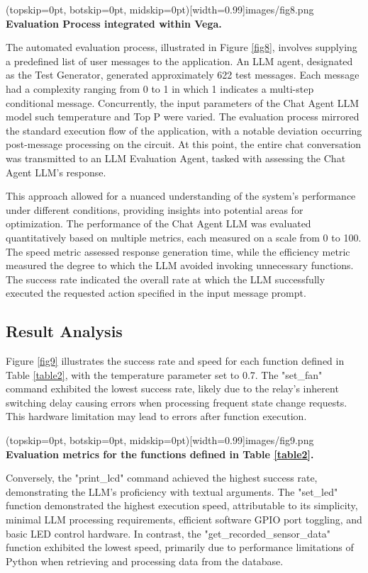 \documentclass{ieeeaccess}
\begin{document}
\Figure[t!](topskip=0pt, botskip=0pt, midskip=0pt)[width=0.99\columnwidth]{{images/fig8.png}}
{ \textbf{Evaluation Process integrated within Vega.}\label{fig8}}

The automated evaluation process, illustrated in Figure \ref{fig8}, involves supplying a predefined list of user messages to the application. An LLM agent, designated as the Test Generator, generated approximately 622 test messages. Each message had a complexity ranging from 0 to 1 in which 1 indicates a multi-step conditional message. Concurrently, the input parameters of the Chat Agent LLM model such temperature and Top P \cite{rum2024setting} were varied. The evaluation process mirrored the standard execution flow of the application, with a notable deviation occurring post-message processing on the circuit. At this point, the entire chat conversation was transmitted to an LLM Evaluation Agent, tasked with assessing the Chat Agent LLM's response. 

This approach allowed for a nuanced understanding of the system's performance under different conditions, providing insights into potential areas for optimization. The performance of the Chat Agent LLM was evaluated quantitatively based on multiple metrics, each measured on a scale from 0 to 100. The speed metric assessed response generation time, while the efficiency metric measured the degree to which the LLM avoided invoking unnecessary functions. The success rate indicated the overall rate at which the LLM successfully executed the requested action specified in the input message prompt.

\subsection{Result Analysis}
Figure \ref{fig9} illustrates the success rate and speed for each function defined in Table \ref{table2}, with the temperature parameter set to 0.7. The "set\_fan" command exhibited the lowest success rate, likely due to the relay's inherent switching delay causing errors when processing frequent state change requests. This hardware limitation may lead to errors after function execution.  

\Figure[h!](topskip=0pt, botskip=0pt,
midskip=0pt)[width=0.99\columnwidth]{{images/fig9.png}}
{ \textbf{Evaluation metrics for the functions defined in Table \ref{table2}.}\label{fig9}}

Conversely, the "print\_lcd" command achieved the highest success rate, demonstrating the LLM's proficiency with textual arguments. The "set\_led" function demonstrated the highest execution speed, attributable to its simplicity, minimal LLM processing requirements, efficient software GPIO port toggling, and basic LED control hardware. In contrast, the "get\_recorded\_sensor\_data" function exhibited the lowest speed, primarily due to performance limitations of Python when retrieving and processing data from the database.
\end{document}
